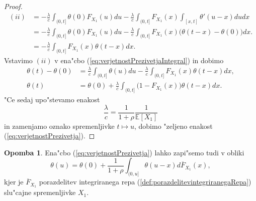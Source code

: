 \documentclass[12pt, a4paper, reqno]{amsart}
\theoremstyle{definition}
\newtheorem{opomba}[definicija]{Opomba}
\theoremstyle{plain}
\newcommand{\E}{\mathbb{E}}
\newcommand{\1}{\mathds{1}}
\begin{document}
\begin{proof}
                \begin{align*}
                    (ii)    &=  - \frac{\lambda}{c}\int_{(0, t]}\theta(0)F_{X_1}(u)du - \frac{\lambda}{c}\int_{(0, t]}F_{X_1}(x)\int_{[x, t]}\theta'(u - x)dudx \\
                            &= - \frac{\lambda}{c}\int_{(0, t]}\theta(0)F_{X_1}(u)du - \frac{\lambda}{c}\int_{(0, t]}F_{X_1}(x)\bigl(\theta(t-x) - \theta(0)\bigr)dx.\\
                            &= - \frac{\lambda}{c}\int_{(0, t]}F_{X_1}(x)\theta(t - x)dx.
                \end{align*}
                Vstavimo $(ii)$ v ena"cbo (\ref{eq:verjetnostPrezivetjaIntegral}) in dobimo
                \begin{align*}
                    \theta(t) - \theta(0) &= \frac{\lambda}{c}\int_{(0, t]}\theta(u)du - \frac{\lambda}{c}\int_{(0, t]}F_{X_1}(x)\theta(t - x)dx,\\
                    \theta(t) &= \theta(0) + \frac{\lambda}{c}\int_{(0, t]}\bigl(1 - F_{X_1}(x)\bigr)\theta(t - x)dx.
                \end{align*}
                "Ce sedaj upo"stevamo enakost 
                \begin{equation*}
                    \frac{\lambda}{c} = \frac{1}{1 + \rho}\frac{1}{\E\left[X_1\right]}
                \end{equation*}
                in zamenjamo oznako spremenljivke $t\mapsto u$, dobimo "zeljeno enakost (\ref{eq:verjetnostPrezivetja}).

            \end{proof}

            \begin{opomba}
                    Ena"cbo (\ref{eq:verjetnostPrezivetja}) lahko zapi"semo tudi v obliki 
                    \begin{equation}
                        \theta(u) = \theta(0) + \frac{1}{1+\rho}\int_{(0, u]}\theta(u - x)d\overline{F}_{X_1}(x),
                        \label{eq:verjetnostPrezivetja2}
                    \end{equation}
                    kjer je $\overline{F}_{X_1}$ porazdelitev integriranega repa (\ref{def:porazdelitevintegriranegaRepa}) 
                    slu"cajne spremenljivke $X_1$.
                \label{op:verjetnostPrezivetja1}
            \end{opomba}
\end{document}
